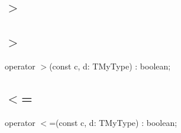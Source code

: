 \documentclass{report}
\newif\ifpdf
\begin{document}
\subsection*{\large{\textbf{{$>$}}}\normalsize\hspace{1ex}\hrulefill}
\else
\subsection*{{$>$}}
\fi
\label{ok_operator_test->}
\index{{$>$}}
\begin{list}{}{
\setlength{\itemindent}{0cm}
\setlength{\listparindent}{0cm}
\setlength{\leftmargin}{\evensidemargin}
\addtolength{\leftmargin}{\tmplength}
\settowidth{\labelsep}{X}
\addtolength{\leftmargin}{\labelsep}
\setlength{\labelwidth}{\tmplength}
}
\item[\textbf{Declaration}\hfill]
\ifpdf
\begin{flushleft}
\fi
\begin{ttfamily}
operator {$>$}(const c, d: TMyType) : boolean;\end{ttfamily}

\ifpdf
\end{flushleft}
\fi

\end{list}
\ifpdf
\subsection*{\large{\textbf{{$<$}=}}\normalsize\hspace{1ex}\hrulefill}
\else
\subsection*{{$<$}=}
\fi
\label{ok_operator_test-<=}
\index{{$<$}=}
\begin{list}{}{
\setlength{\itemindent}{0cm}
\setlength{\listparindent}{0cm}
\setlength{\leftmargin}{\evensidemargin}
\addtolength{\leftmargin}{\tmplength}
\settowidth{\labelsep}{X}
\addtolength{\leftmargin}{\labelsep}
\setlength{\labelwidth}{\tmplength}
}
\item[\textbf{Declaration}\hfill]
\ifpdf
\begin{flushleft}
\fi
\begin{ttfamily}
operator {$<$}=(const c, d: TMyType) : boolean;\end{ttfamily}

\ifpdf
\end{flushleft}
\fi

\end{list}
\ifpdf
\end{document}
